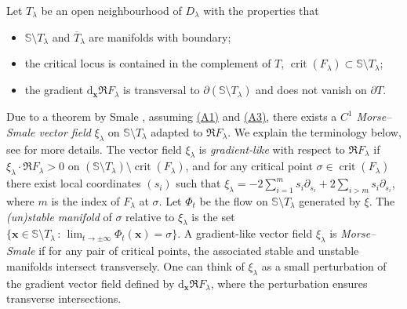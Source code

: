 \documentclass[11pt, a4paper]{article}
\numberwithin{theorem}{section}
\theoremstyle{remark}
\DeclareMathOperator{\crit}{crit}
\renewcommand{\d}{\mathrm{d}}
\renewcommand{\Re}{\mathfrak{R}}
\newcommand{\bb}[1]{\boldsymbol{#1}}
\newcommand{\Sc}{\mathbb{S}}
\theoremstyle{theorem}
\begin{document}
Let $T_\lambda$ be an open neighbourhood of $D_\lambda$ with the properties that 
\begin{itemize}
  \item $\Sc \setminus T_\lambda$ and $\overline{T}_\lambda$ are manifolds with boundary;
  \item the critical locus is contained in the complement of $T$, $\crit(F_\lambda) \subset \Sc \setminus T_\lambda$;
  \item the gradient $\d_{\bb{x}}\Re F_\lambda$ is transversal to $\partial(\Sc\setminus T_\lambda)$ and does not vanish on $\partial T$.
\end{itemize}
Due to a theorem by Smale \cite[Theorem A]{smale1961gradient}, assuming \hyperref[ass:A1]{(A1)} and \hyperref[ass:A3]{(A3)}, there exists a $C^1$ \emph{Morse--Smale vector field} $\xi_\lambda$ on $\Sc \setminus T_\lambda$ adapted to $\Re F_\lambda$. We explain the terminology below, see \cite[\S 2.4]{MorseTheoryInvitation} for more details. The vector field $\xi_\lambda$ is \emph{gradient-like} with respect to $\Re F_\lambda$ if $\xi_\lambda \cdot \Re F_\lambda > 0$ on $(\Sc \setminus T_\lambda)\setminus \crit(F_\lambda)$, and for any critical point $\sigma\in \crit(F_\lambda)$ there exist local coordinates $(s_i)$ such that $\xi_\lambda = -2 \sum_{i=1}^m s_i \partial_{s_i} + 2 \sum_{i > m} s_i \partial_{s_i}$, where $m$ is the index of $F_\lambda$ at $\sigma$. 
Let $\Phi_t$ be the flow on $\Sc\setminus T_\lambda$ generated by $\xi$. The \emph{(un)stable manifold} of $\sigma$ relative to $\xi_\lambda$ is the set $\{ \bb{x} \in \Sc\setminus T_\lambda \,:\, \lim_{t\to \pm\infty}  \Phi_t(\bb{x}) = \sigma\}$. A gradient-like vector field $\xi_\lambda$ is \emph{Morse--Smale} if for any pair of critical points, the associated stable and unstable manifolds intersect transversely. One can think of $\xi_\lambda$ as a small perturbation of the gradient vector field defined by $\d_{\bb{x}}\Re F_\lambda$, where the perturbation ensures transverse intersections. \par   
\end{document}

